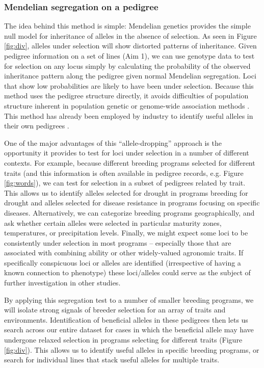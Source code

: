 \documentclass[12pt]{article}
\begin{document}
\subsubsection*{Mendelian segregation on a pedigree}

The idea behind this method is simple: Mendelian genetics provides the simple null model for inheritance of alleles in the absence of selection.
As seen in Figure \ref{fig:div}, alleles under selection will show distorted patterns of inheritance.
Given pedigree information on a set of lines (Aim 1), we can use genotype data to test for selection on any locus simply by calculating the probability of the observed inheritance pattern along the pedigree given normal Mendelian segregation.
Loci that show low probabilities are likely to have been under selection.
Because this method uses the pedigree structure directly, it avoids difficulties of population structure inherent in population genetic or genome-wide association methods \citep{astle2009population}.
This method has already been employed by industry to identify useful alleles in their own pedigrees \citep{sebastian1995method}.

One of the major advantages of this 	``allele-dropping'' approach is the opportunity it provides to test for loci under selection in a number of different contexts.
For example, because  different breeding programs selected for different traits (and this information is often available in pedigree records, e.g. Figure \ref{fig:words}), we can test for selection in a subset of pedigrees related by trait.
This allows us to identify alleles selected for drought in programs breeding for drought and alleles selected for disease resistance in programs focusing on specific diseases.
Alternatively, we can categorize breeding programs geographically, and ask whether certain alleles were selected in particular maturity zones, temperatures, or precipitation levels.
Finally, we might expect some loci to be consistently under selection in most programs -- especially those that are associated with combining ability or other widely-valued agronomic traits. If specifically conspicuous loci or alleles are identified (irrespective of having a known connection to phenotype) these loci/alleles could serve as the subject of further investigation in other studies.

By applying this segregation test to a number of smaller breeding programs, we will  isolate strong signals of breeder selection for an array of traits and environments. 
Identification of beneficial alleles in these pedigrees then lets us search across our entire dataset for cases in which the beneficial allele may have undergone relaxed selection in programs selecting for different traits (Figure \ref{fig:div}).
This allows us to identify useful alleles in specific breeding programs, or search for individual lines that stack useful alleles for multiple traits. 
\end{document}
